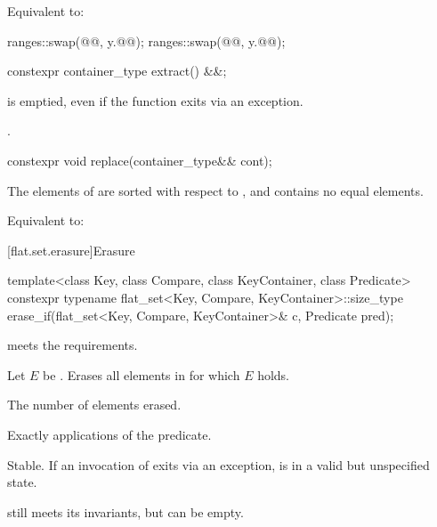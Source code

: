 \begin{itemdescr}
\pnum
\effects
Equivalent to:
\begin{codeblock}
ranges::swap(@@, y.@@);
ranges::swap(@@, y.@@);
\end{codeblock}
\end{itemdescr}

%
\begin{itemdecl}
constexpr container_type extract() &&;
\end{itemdecl}

\begin{itemdescr}
\pnum
\ensures
{} is emptied, even if the function exits via an exception.

\pnum
\returns
{}.
\end{itemdescr}

%
\begin{itemdecl}
constexpr void replace(container_type&& cont);
\end{itemdecl}

\begin{itemdescr}
\pnum
\expects
The elements of  are sorted with respect to , and
 contains no equal elements.

\pnum
\effects
Equivalent to: 
\end{itemdescr}

[flat.set.erasure]{Erasure}

%
\begin{itemdecl}
template<class Key, class Compare, class KeyContainer, class Predicate>
  constexpr typename flat_set<Key, Compare, KeyContainer>::size_type
    erase_if(flat_set<Key, Compare, KeyContainer>& c, Predicate pred);
\end{itemdecl}

\begin{itemdescr}
\pnum
\expects
{} meets the  requirements.

\pnum
\effects
Let $E$ be .
Erases all elements  in  for which $E$ holds.

\pnum
\returns
The number of elements erased.

\pnum
\complexity
Exactly  applications of the predicate.

\pnum
\remarks
Stable.
If an invocation of  exits via an exception,
 is in a valid but unspecified state.
\begin{note}
 still meets its invariants, but can be empty.
\end{note}
\end{itemdescr}

